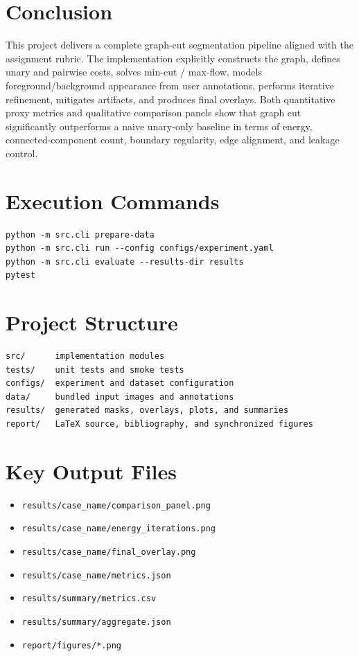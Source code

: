 \documentclass[conference]{IEEEtran}
\begin{document}
\section{Conclusion}
This project delivers a complete graph-cut segmentation pipeline aligned with the assignment rubric. The implementation explicitly constructs the graph, defines unary and pairwise costs, solves min-cut / max-flow, models foreground/background appearance from user annotations, performs iterative refinement, mitigates artifacts, and produces final overlays. Both quantitative proxy metrics and qualitative comparison panels show that graph cut significantly outperforms a naive unary-only baseline in terms of energy, connected-component count, boundary regularity, edge alignment, and leakage control.

\appendices
\section{Execution Commands}
\begin{verbatim}
python -m src.cli prepare-data
python -m src.cli run --config configs/experiment.yaml
python -m src.cli evaluate --results-dir results
pytest
\end{verbatim}

\section{Project Structure}
\begin{verbatim}
src/      implementation modules
tests/    unit tests and smoke tests
configs/  experiment and dataset configuration
data/     bundled input images and annotations
results/  generated masks, overlays, plots, and summaries
report/   LaTeX source, bibliography, and synchronized figures
\end{verbatim}

\section{Key Output Files}
\begin{itemize}
  \item \texttt{results/case\_name/comparison\_panel.png}
  \item \texttt{results/case\_name/energy\_iterations.png}
  \item \texttt{results/case\_name/final\_overlay.png}
  \item \texttt{results/case\_name/metrics.json}
  \item \texttt{results/summary/metrics.csv}
  \item \texttt{results/summary/aggregate.json}
  \item \texttt{report/figures/*.png}
\end{itemize}



\end{document}
